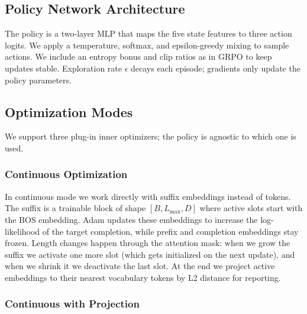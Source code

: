 \documentclass[11pt]{article}
\begin{document}
\subsection{Policy Network Architecture}
\label{subsec:policy}

The policy is a two-layer MLP that maps the five state features to three action logits. We apply a temperature, softmax, and epsilon-greedy mixing to sample actions. We include an entropy bonus and clip ratios as in GRPO to keep updates stable. Exploration rate $\epsilon$ decays each episode; gradients only update the policy parameters.

\subsection{Optimization Modes}
\label{subsec:modes}

We support three plug-in inner optimizers; the policy is agnostic to which one is used.

\subsubsection{Continuous Optimization}
\label{subsubsec:continuous}

In continuous mode we work directly with suffix embeddings instead of tokens. The suffix is a trainable block of shape $[B, L_{\max}, D]$ where active slots start with the BOS embedding. Adam \citep{kingma2014adam} updates these embeddings to increase the log-likelihood of the target completion, while prefix and completion embeddings stay frozen. Length changes happen through the attention mask: when we grow the suffix we activate one more slot (which gets initialized on the next update), and when we shrink it we deactivate the last slot. At the end we project active embeddings to their nearest vocabulary tokens by L2 distance for reporting.

\subsubsection{Continuous with Projection}
\label{subsubsec:continuous_proj}
\end{document}
